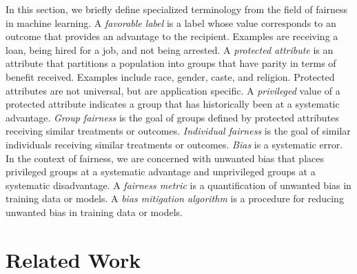 \documentclass{article}
\begin{document}
In this section, we briefly define specialized terminology from the field of fairness in machine learning. A \emph{favorable label} is a label whose value corresponds to an outcome that provides an advantage to the recipient. Examples are receiving a loan, being hired for a job, and not being arrested. A \emph{protected attribute} is an attribute that partitions a population into groups that have parity in terms of benefit received.
Examples include race, gender, caste, and religion. Protected attributes are not universal, but are application specific. A \emph{privileged} value of a protected attribute indicates a group that has historically been at a systematic advantage. \emph{Group fairness} is the goal of groups defined by protected attributes receiving similar treatments or outcomes. \emph{Individual fairness} is the goal of similar individuals receiving similar treatments or outcomes.  \emph{Bias} is a systematic error. In the context of fairness, we are concerned with unwanted bias that places privileged groups at a systematic advantage and unprivileged groups at a systematic disadvantage. A \emph{fairness metric} is a quantification of unwanted bias in training data or models. A \emph{bias mitigation algorithm} is a procedure for reducing unwanted bias in training data or models. 

\section{Related Work}
\label{sec:relatedworks}
\end{document}
